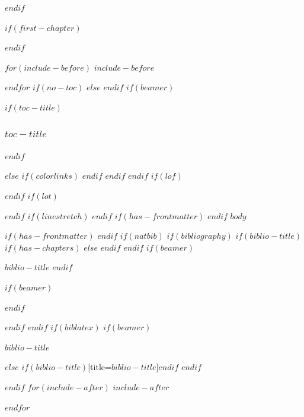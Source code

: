 \documentclass[
$if(fontsize)$
  $fontsize$,
$endif$
$if(papersize)$
  $papersize$paper,
$else$
  paper=a4,
$endif$
$if(beamer)$
  ignorenonframetext,
$if(handout)$
  handout,
$endif$
$if(aspectratio)$
  aspectratio=$aspectratio$,
$endif$
$endif$
$for(classoption)$
  $classoption$$sep$,
$endfor$
  ,captions=tableheading
]{$if(beamer)$$documentclass$$else$$if(book)$scrbook$else$scrartcl$endif$$endif$}
\newif\ifbibliography
\newcounter{none}
\begin{document}
$endif$
\setcounter{page}{0} %


$if(first-chapter)$
\setcounter{chapter}{$first-chapter$}
\addtocounter{chapter}{-1}
$endif$

$for(include-before)$
$include-before$

$endfor$
$if(no-toc)$
$else$
\renewcommand*\contentsname{$toc-title$}
\renewcommand*\contentsname{Table of Contents}
$endif$
$if(beamer)$
\begin{frame}[allowframebreaks]
$if(toc-title)$
  \frametitle{$toc-title$}
$endif$
  \tableofcontents[hideallsubsections]
\end{frame}
\newpage
$else$
{
$if(colorlinks)$
\hypersetup{linkcolor=$if(toccolor)$$toccolor$$else$$endif$}
$endif$
\setcounter{tocdepth}{$toc-depth$}
\tableofcontents
\newpage
}
$endif$
$endif$
$if(lof)$
\listoffigures
$endif$
$if(lot)$
\listoftables
$endif$
$if(linestretch)$
$endif$
$if(has-frontmatter)$
\mainmatter
$endif$
$body$

$if(has-frontmatter)$
\backmatter
$endif$
$if(natbib)$
$if(bibliography)$
$if(biblio-title)$
$if(has-chapters)$
\renewcommand\bibname{$biblio-title$}
$else$
\renewcommand\refname{$biblio-title$}
$endif$
$endif$
$if(beamer)$
\begin{frame}[allowframebreaks]{$biblio-title$}
  \bibliographytrue
$endif$
  
$if(beamer)$
\end{frame}
$endif$

$endif$
$endif$
$if(biblatex)$
$if(beamer)$
\begin{frame}[allowframebreaks]{$biblio-title$}
  \bibliographytrue
  \printbibliography[heading=none]
\end{frame}
$else$
\printbibliography$if(biblio-title)$[title=$biblio-title$]$endif$
$endif$

$endif$
$for(include-after)$
$include-after$

$endfor$
\end{document}

